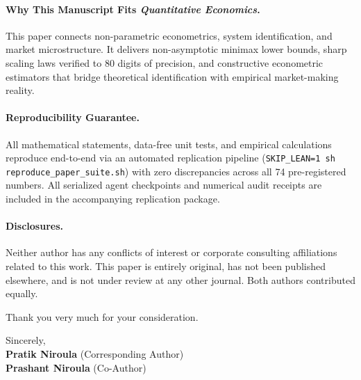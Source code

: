 \documentclass[11pt]{article}
\begin{document}
\paragraph{Why This Manuscript Fits \textit{Quantitative Economics}.}
This paper connects non-parametric econometrics, system identification, and market microstructure. It delivers non-asymptotic minimax lower bounds, sharp scaling laws verified to 80 digits of precision, and constructive econometric estimators that bridge theoretical identification with empirical market-making reality.

\paragraph{Reproducibility Guarantee.}
All mathematical statements, data-free unit tests, and empirical calculations reproduce end-to-end via an automated replication pipeline (\texttt{SKIP\_LEAN=1 sh reproduce\_paper_suite.sh}) with zero discrepancies across all 74 pre-registered numbers. All serialized agent checkpoints and numerical audit receipts are included in the accompanying replication package.

\paragraph{Disclosures.}
Neither author has any conflicts of interest or corporate consulting affiliations related to this work. This paper is entirely original, has not been published elsewhere, and is not under review at any other journal. Both authors contributed equally.

Thank you very much for your consideration.

\vspace{1.5em}
\noindent
Sincerely, \\[1.0em]
\textbf{Pratik Niroula} (Corresponding Author) \\
\textbf{Prashant Niroula} (Co-Author)
\end{document}
